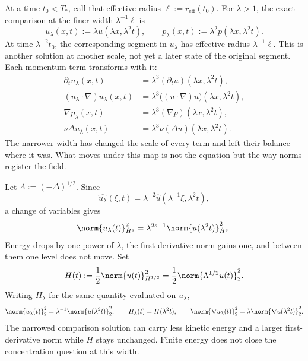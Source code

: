 
At a time \(t_0<T_*\), call that effective radius \(\ell:=r_{\mathrm{eff}}(t_0)\). For \(\lambda>1\), the exact \NavierStokes{} comparison at the finer width \(\lambda^{-1}\ell\) is
\[
  u_\lambda(x,t)
  :=
  \lambda u(\lambda x,\lambda^2t),
  \qquad
  p_\lambda(x,t)
  :=
  \lambda^2p(\lambda x,\lambda^2t).
\]
At time \(\lambda^{-2}t_0\), the corresponding segment in \(u_\lambda\) has effective radius \(\lambda^{-1}\ell\). This is another solution at another scale, not yet a later state of the original segment. Each momentum term transforms with it:
\[
\begin{aligned}
  \partial_tu_\lambda(x,t)
  &=
  \lambda^3(\partial_tu)(\lambda x,\lambda^2t),
  \\
  (u_\lambda\cdot\nabla)u_\lambda(x,t)
  &=
  \lambda^3\bigl((u\cdot\nabla)u\bigr)(\lambda x,\lambda^2t),
  \\
  \nabla p_\lambda(x,t)
  &=
  \lambda^3(\nabla p)(\lambda x,\lambda^2t),
  \\
  \nu\Delta u_\lambda(x,t)
  &=
  \lambda^3\nu(\Delta u)(\lambda x,\lambda^2t).
\end{aligned}
\]
The narrower width has changed the scale of every term and left their balance where it was. What moves under this map is not the equation but the way norms register the field.


Let \(\Lambda:=(-\Delta)^{1/2}\). Since
\[
  \widehat{u_\lambda}(\xi,t)
  =
  \lambda^{-2}\widehat u(\lambda^{-1}\xi,\lambda^2t),
\]
a change of variables gives
\[
  \norm{u_\lambda(t)}_{\dot H^s}^2
  =
  \lambda^{2s-1}
  \norm{u(\lambda^2t)}_{\dot H^s}^2.
\]
Energy drops by one power of \(\lambda\), the first-derivative norm gains one, and between them one level does not move. Set
\[
  H(t)
  :=
  \frac12\norm{u(t)}_{\dot H^{1/2}}^2
  =
  \frac12\norm{\Lambda^{1/2}u(t)}_2^2.
\]
Writing \(H_\lambda\) for the same quantity evaluated on \(u_\lambda\),
\[
  \norm{u_\lambda(t)}_2^2
  =
  \lambda^{-1}\norm{u(\lambda^2t)}_2^2,
  \qquad
  H_\lambda(t)=H(\lambda^2t),
  \qquad
  \norm{\nabla u_\lambda(t)}_2^2
  =
  \lambda\norm{\nabla u(\lambda^2t)}_2^2.
\]
The narrowed comparison solution can carry less kinetic energy and a larger first-derivative norm while \(H\) stays unchanged. Finite energy does not close the concentration question at this width.


